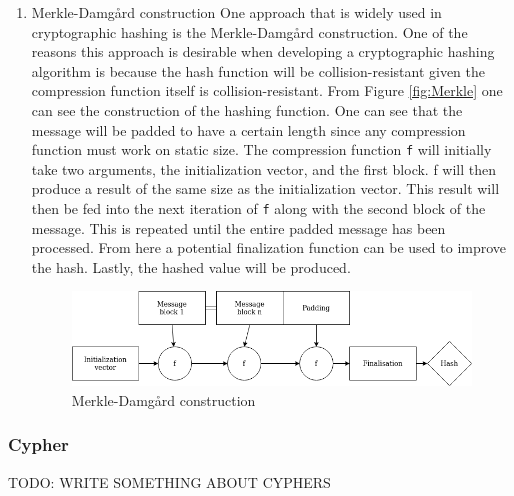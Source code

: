 \documentclass[a4paper]{article}
\begin{document}
\begin{enumerate}
\item Merkle-Damgård construction
\label{sec:orgd902b67}
One approach that is widely used in cryptographic hashing is the Merkle-Damgård construction. One of the reasons this approach is desirable when developing a cryptographic hashing algorithm is because the hash function will be collision-resistant given the compression function itself is collision-resistant.
From Figure \ref{fig:Merkle} one can see the construction of the hashing function. One can see that the message will be padded to have a certain length since any compression function must work on static size. The compression function \texttt{f} will initially take two arguments, the initialization vector, and the first block. f will then produce a result of the same size as the initialization vector. This result will then be fed into the next iteration of \texttt{f} along with the second block of the message. This is repeated until the entire padded message has been processed. From here a potential finalization function can be used to improve the hash. Lastly, the hashed value will be produced.

\begin{figure}[htbp]
\centering
\includegraphics[width=.9\linewidth]{Background/merkle.png}
\caption{\label{fig:org2f035a4}Merkle-Damgård construction}
\end{figure}
\end{enumerate}
\subsubsection{Cypher}
\label{sec:org468ea63}
TODO: WRITE SOMETHING ABOUT CYPHERS
\end{document}
